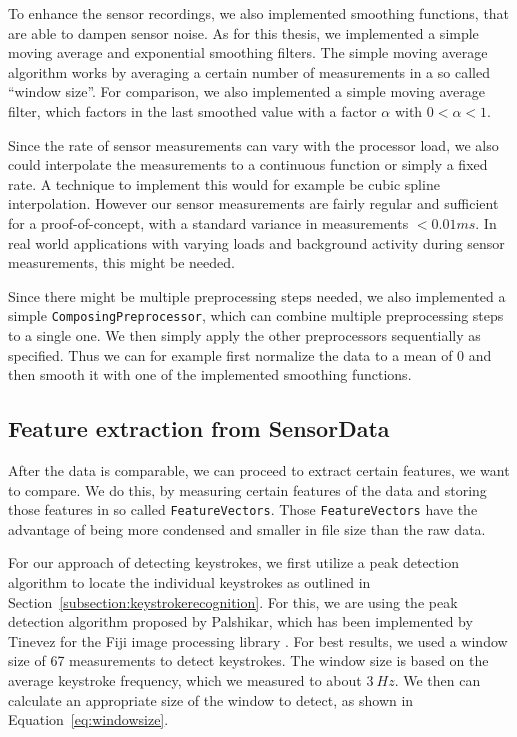 To enhance the sensor recordings, we also implemented smoothing functions, that are able to dampen sensor noise. As for this thesis, we implemented a simple moving average and exponential smoothing filters. The simple moving average algorithm works by averaging a certain number of measurements in a so called ``window size''. For comparison, we also implemented a simple moving average filter, which factors in the last smoothed value with a factor $\alpha$ with $0 < \alpha < 1$.

Since the rate of sensor measurements can vary with the processor load, we also could interpolate the measurements to a continuous function or simply a fixed rate. A technique to implement this would for example be cubic spline interpolation. However our sensor measurements are fairly regular and sufficient for a proof-of-concept, with a standard variance in measurements $< 0.01ms$. In real world applications with varying loads and background activity during sensor measurements, this might be needed.

Since there might be multiple preprocessing steps needed, we also implemented a simple \lstinline$ComposingPreprocessor$, which can combine multiple preprocessing steps to a single one. We then simply apply the other preprocessors sequentially as specified. Thus we can for example first normalize the data to a mean of 0 and then smooth it with one of the implemented smoothing functions.

\subsection{Feature extraction from SensorData}\label{subsection:featureextraction}
After the data is comparable, we can proceed to extract certain features, we want to compare. We do this, by measuring certain features of the data and storing those features in so called \lstinline$FeatureVectors$. Those \lstinline$FeatureVectors$ have the advantage of being more condensed and smaller in file size than the raw data.

For our approach of detecting keystrokes, we first utilize a peak detection algorithm to locate the individual keystrokes as outlined in Section~\ref{subsection:keystrokerecognition}. For this, we are using the peak detection algorithm proposed by Palshikar, which has been implemented by Tinevez for the Fiji image processing library \cite{palshikar2009simple, tinevez2011peak}. For best results, we used a window size of 67 measurements to detect keystrokes. The window size is based on the average keystroke frequency, which we measured to about $\SI{3}{Hz}$. We then can calculate an appropriate size of the window to detect, as shown in Equation~\ref{eq:windowsize}.

